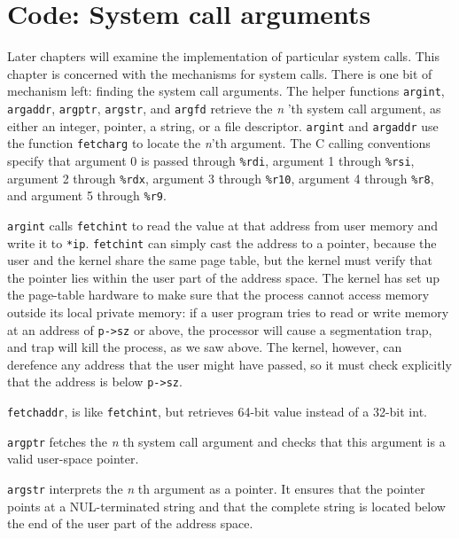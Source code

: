 {\section{Code: System call arguments}

Later chapters will examine the implementation of
particular system calls.
This chapter is concerned with the mechanisms for system calls.
There is one bit of mechanism left: finding the system call arguments.
The helper functions
\lstinline{argint},
\lstinline{argaddr},
\lstinline{argptr},
\lstinline{argstr},
and
\lstinline{argfd}
retrieve the 
\textit{n} 'th 
system call
argument, as either an integer, pointer, a string, or a file descriptor.
\lstinline{argint}
and
\lstinline{argaddr}
use the function
\lstinline{fetcharg}
to locate the
\textit{n}'th 
argument. The C calling conventions specify that argument 0 is passed
through
\texttt{\%rdi},
argument 1 through
\texttt{\%rsi},
argument 2 through
\texttt{\%rdx},
argument 3 through
\texttt{\%r10},
argument 4 through
\texttt{\%r8},
and argument 5 through
\texttt{\%r9}.

\lstinline{argint} 
calls 
\lstinline{fetchint}
to read the value at that address from user memory and write it to
\lstinline{*ip}.  
\lstinline{fetchint} 
can simply cast the address to a pointer, because the user and the
kernel share the same page table, but the kernel must verify that the
pointer lies within the user part of the address
space.
The kernel has set up the page-table hardware to make sure
that the process cannot access memory outside its local private memory:
if a user program tries to read or write memory at an address of
\lstinline{p->sz} 
or above, the processor will cause a segmentation trap, and trap will
kill the process, as we saw above.
The kernel, however,
can derefence any address that the user might have passed, so it must check explicitly that the address is below
\lstinline{p->sz}.

\lstinline{fetchaddr},
is like
\lstinline{fetchint},
but retrieves 64-bit value instead of a 32-bit int.

\lstinline{argptr}
fetches the
\textit{n} th 
system call argument and checks that this argument is a valid
user-space pointer.

\lstinline{argstr} 
interprets the
\textit{n} th 
argument as a pointer.  It ensures that the pointer points at a
NUL-terminated string and that the complete string is located below
the end of the user part of the address space.

}
